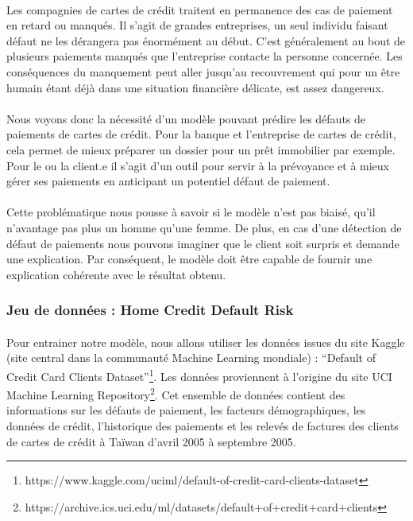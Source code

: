 \documentclass[10pt, french, a4paper]{report}
\begin{document}
\paragraph{}
Les compagnies de cartes de crédit traitent en permanence des cas de paiement en retard ou manqués. Il s'agit de grandes entreprises, un seul individu faisant défaut ne les dérangera pas énormément au début. C'est généralement au bout de plusieurs paiements manqués que l'entreprise contacte la personne concernée. Les conséquences du manquement peut aller jusqu'au recouvrement qui pour un être humain étant déjà dans une situation financière délicate, est assez dangereux.

\paragraph{}
Nous voyons donc la nécessité d'un modèle pouvant prédire les défauts de paiements de cartes de crédit. Pour la banque et l'entreprise de cartes de crédit, cela permet de mieux préparer un dossier pour un prêt immobilier par exemple. Pour le ou la client.e il s'agit d'un outil pour servir à la prévoyance et à mieux gérer ses paiements en anticipant un potentiel défaut de paiement.

\paragraph{}
Cette problématique nous pousse à savoir si le modèle n'est pas biaisé, qu'il n'avantage pas plus un homme qu'une femme. De plus, en cas d'une détection de défaut de paiements nous pouvons imaginer que le client soit surpris et demande une explication. Par conséquent, le modèle doit être capable de fournir une explication cohérente avec le résultat obtenu. 
 

\subsubsection{Jeu de données : Home Credit Default Risk}

\paragraph{}
Pour entrainer notre modèle, nous allons utiliser les données issues du site Kaggle (site central dans la communauté Machine Learning mondiale) : ``Default of Credit Card Clients Dataset''\footnote{https://www.kaggle.com/uciml/default-of-credit-card-clients-dataset}. Les données proviennent à l'origine du site UCI Machine Learning Repository\footnote{https://archive.ics.uci.edu/ml/datasets/default+of+credit+card+clients}. Cet ensemble de données contient des informations sur les défauts de paiement, les facteurs démographiques, les données de crédit, l'historique des paiements et les relevés de factures des clients de cartes de crédit à Taïwan d'avril 2005 à septembre 2005.
\end{document}
